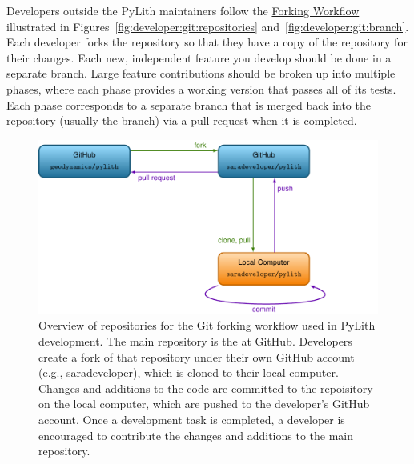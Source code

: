 Developers outside the PyLith maintainers follow the
\href{https://www.atlassian.com/git/tutorials/comparing-workflows/forking-workflow}{Forking
  Workflow} illustrated in
Figures~\vref{fig:developer:git:repositories}
and~\vref{fig:developer:git:branch}. Each developer forks the
 repository so that they have a copy of
the repository for their changes. Each new, independent feature you
develop should be done in a separate branch. Large feature
contributions should be broken up into multiple phases, where each
phase provides a working version that passes all of its tests. Each
phase corresponds to a separate branch that is merged back into the
 repository (usually the
 branch) via a
\href{https://help.github.com/articles/about-pull-requests/}{pull
  request} when it is completed.

\begin{figure}[htbp]
  \includegraphics[scale=0.7]{developer/figs/gitworkflow_repositories}
  \caption{Overview of repositories for the Git forking workflow used in PyLith
    development. The main repository is the
     at GitHub. Developers create a fork
    of that repository under their own GitHub account (e.g.,
    saradeveloper), which is cloned to their local computer. Changes
    and additions to the code are committed to the repoisitory on the
    local computer, which are pushed to the developer's GitHub
    account. Once a development task is completed, a developer is
    encouraged to contribute the changes and additions to the main
    repository.}
  \label{fig:developer:git:repositories}
\end{figure}

